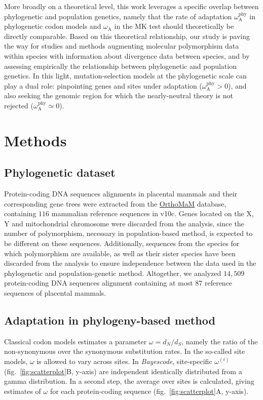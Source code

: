 \documentclass{article}
\newcommand{\dn}{d_N}
\newcommand{\ds}{d_S}
\newcommand{\dnds}{\dn / \ds}
\newcommand{\rateApop}{\omega_{\mathrm{A}}}
\newcommand{\rateAphy}{\rateApop^{\mathrm{phy}}}
\begin{document}
    More broadly on a theoretical level, this work leverages a specific overlap between phylogenetic and population genetics, namely that the rate of adaptation $\rateAphy$ in phylogenetic codon models and $\rateApop$ in the MK test should theoretically be directly comparable.
    Based on this theoretical relationship, our study is paving the way for studies and methods augmenting molecular polymorphism data within species with information about divergence data between species\cite{chen_hunting_2021}, and by assessing empirically the relationship between phylogenetic and population genetics\cite{thorne_codon_2012}.
    In this light, mutation-selection models at the phylogenetic scale can play a dual role: pinpointing genes and sites under adaptation ($\rateAphy > 0$), and also seeking the genomic region for which the nearly-neutral theory is not rejected ($\rateAphy \simeq 0$).

    \section*{Methods}\label{sec:methods}

    \subsection*{Phylogenetic dataset}
    Protein-coding DNA sequences alignments in placental mammals and their corresponding gene trees were extracted from the \href{https://www.orthomam.univ-montp2.fr}{OrthoMaM} database, containing $116$ mammalian reference sequences in v10c\cite{ranwez_orthomam_2007, douzery_orthomam_2014, scornavacca_orthomam_2019}.
    Genes located on the X, Y and mitochondrial chromosome were discarded from the analysis, since the number of polymorphism, necessary in population-based method, is expected to be different on these sequences.
    Additionally, sequences from the species for which polymorphism are available, as well as their sister species have been discarded from the analysis to ensure independence between the data used in the phylogenetic and population-genetic method.
    Altogether, we analyzed $14,509$ protein-coding DNA sequences alignment containing at most $87$ reference sequences of placental mammals.

    \subsection*{Adaptation in phylogeny-based method}
    Classical codon models estimates a parameter $\omega=\dnds$, namely the ratio of the non-synonymous over the synonymous substitution rates\cite{muse_likelihood_1994,goldman_codonbased_1994}.
    In the so-called site models, $\omega$ is allowed to vary across sites\cite{yang_codonsubstitution_2000, huelsenbeck_dirichlet_2006}.
    In \textit{Bayescode}, site-specific $\omega^{(i)}$ (fig.~\ref{fig:scatterplot}B, y-axis) are independent identically distributed from a gamma distribution\cite{lartillot_phylobayes_2013}.
    In a second step, the average over sites is calculated, giving estimates of $\omega$ for each protein-coding sequence (fig.~\ref{fig:scatterplot}A, y-axis).
\end{document}
